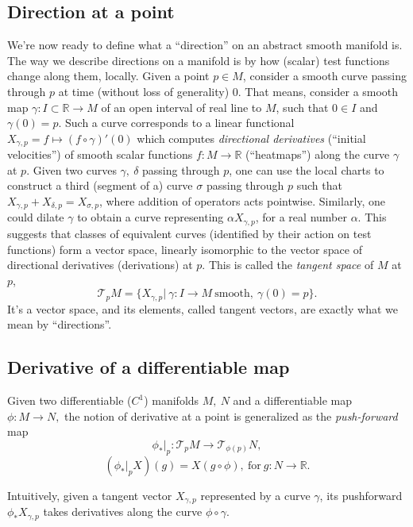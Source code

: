 \subsection*{Direction at a point}

We're now ready to define what a ``direction'' on an abstract smooth manifold
is. The way we describe directions on a manifold is by how (scalar) test
functions change along them, locally.
Given a point \( p\in M \), consider a smooth curve passing through \( p \) at
time (without loss of generality) \( 0 \). That means, consider a smooth map \(
\gamma:I\subset\mathbb{R} \to M \) of an open interval of real line to \( M \),
such that \( 0\in I \) and \( \gamma(0) = p \). Such a curve corresponds to a
linear functional \( X_{\gamma, p} = f\mapsto (f\circ \gamma)'(0) \) which
computes \emph{directional derivatives} (``initial velocities'') of smooth
scalar functions \( f:M\to\mathbb{R} \) (``heatmaps'') along the curve \(
\gamma \) at \( p \).
Given two curves \( \gamma,~\delta \) passing through \( p \), one can use the
local charts to construct a third (segment of a) curve \( \sigma \) passing
through \( p \) such that \( X_{\gamma, p} + X_{\delta, p} = X_{\sigma, p} \),
where addition of operators acts pointwise.  Similarly, one could dilate \(
\gamma \) to obtain a curve representing \( \alpha X_{\gamma, p} \), for a real
number \( \alpha \). This suggests that classes of equivalent curves
(identified by their action on test functions) form a vector space, linearly isomorphic
to the vector space of directional derivatives (derivations) at \( p \).
This is called the \emph{tangent space} of \( M \) at \( p \),
\[ \mathcal{T}_pM = \{ X_{\gamma, p}\left|~\gamma:I\to M~\text{smooth},~\gamma(0)=p\right.\}. \]
It's a vector space, and its elements, called tangent vectors, are exactly what
we mean by ``directions''.

\subsection*{Derivative of a differentiable map}

Given two differentiable (\( C^1 \)) manifolds \( M,~N \)
and a differentiable map \( \phi: M\to N, \) the notion of
derivative at a point is generalized as the \emph{push-forward} map
\[ \left.\phi_*\right|_p : \mathcal{T}_p M \to \mathcal{T}_{\phi(p)}N, \]
\[ (\left.\phi_*\right|_p X)(g) = X(g\circ \phi),~\text{for}~g:N\to\mathbb{R}. \]

Intuitively, given a tangent vector \( X_{\gamma, p} \) represented by a curve
\( \gamma \), its pushforward \( \phi_* X_{\gamma, p} \) takes derivatives
along the curve \( \phi \circ \gamma \).

